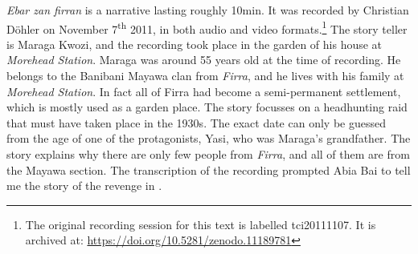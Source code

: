 \textit{Ebar zan firran} is a narrative lasting roughly 10min. It was recorded by Christian Döhler on November 7\textsuperscript{th} 2011, in both audio and video formats.\footnote{The original recording session for this text is labelled tci20111107. It is archived at: \href{https://doi.org/10.5281/zenodo.11189781}{https://doi.org/10.5281/zenodo.11189781}} The story teller is Maraga Kwozi, and the recording took place in the garden of his house at \textit{Morehead Station}. 
Maraga was around 55 years old at the time of recording. He belongs to the Banibani Mayawa clan from \textit{Firra}, and he lives with his family at \textit{Morehead Station}. In fact all of Firra had become a semi-permanent settlement, which is mostly used as a garden place.
The story focusses on a headhunting raid that must have taken place in the 1930s. The exact date can only be guessed from the age of one of the protagonists, Yasi, who was Maraga's grandfather. The story explains why there are only few people from \textit{Firra}, and all of them are from the Mayawa section. The transcription of the recording prompted Abia Bai to tell me the story of the revenge in .